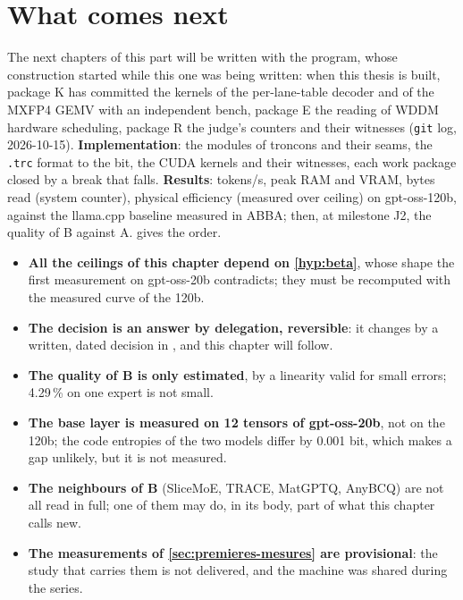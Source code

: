 \section{What comes next}\label{sec:ce-qui-vient}

The next chapters of this part will be written with the program, whose construction started while this one was being written: when this thesis is built, package K has committed the kernels of the per-lane-table decoder and of the MXFP4 GEMV with an independent bench, package E the reading of WDDM hardware scheduling, package R the judge's counters and their witnesses (\texttt{git} log, 2026-10-15). \textbf{Implementation}: the modules of troncons and their seams, the \texttt{.trc} format to the bit, the CUDA kernels and their witnesses, each work package closed by a break that falls. \textbf{Results}: tokens/s, peak RAM and VRAM, bytes read (system counter), physical efficiency (measured over ceiling) on gpt-oss-120b, against the llama.cpp baseline measured in ABBA; then, at milestone J2, the quality of B against A.  gives the order.

\begin{faux}
\begin{itemize}
\item \textbf{All the ceilings of this chapter depend on \cref{hyp:beta}}, whose shape the first measurement on gpt-oss-20b contradicts; they must be recomputed with the measured curve of the 120b.
\item \textbf{The decision is an answer by delegation, reversible}: it changes by a written, dated decision in , and this chapter will follow.
\item \textbf{The quality of B is only estimated}, by a linearity valid for small errors; 4.29\,\% on one expert is not small.
\item \textbf{The base layer is measured on 12 tensors of gpt-oss-20b}, not on the 120b; the code entropies of the two models differ by 0.001 bit, which makes a gap unlikely, but it is not measured.
\item \textbf{The neighbours of B} (SliceMoE, TRACE, MatGPTQ, AnyBCQ) are not all read in full; one of them may do, in its body, part of what this chapter calls new.
\item \textbf{The measurements of \cref{sec:premieres-mesures} are provisional}: the study that carries them is not delivered, and the machine was shared during the series.
\end{itemize}
\end{faux}
